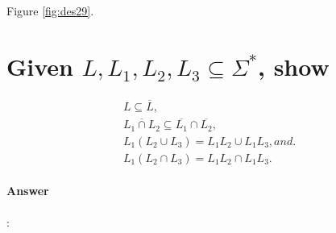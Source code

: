 \documentclass{article}
\begin{document}
Figure \ref{fig:des29}.


\section{Given $L, L_1, L_2, L_3 \subseteq  \Sigma^*$, show}

\begin{gather*}
  L \subseteq \overline{L}, \\
  \overline{ L_1 \cap L_2 } \subseteq \overline{L_1} \cap \overline{L_2}, \\
  L_1(L_2 \cup L_3) = L_1L_2 \cup L_1L_3, and. \\
  L_1(L_2 \cap L_3) = L_1L_2 \cap L_1L_3.
\end{gather*}

\paragraph{Answer}:

\end{document}
